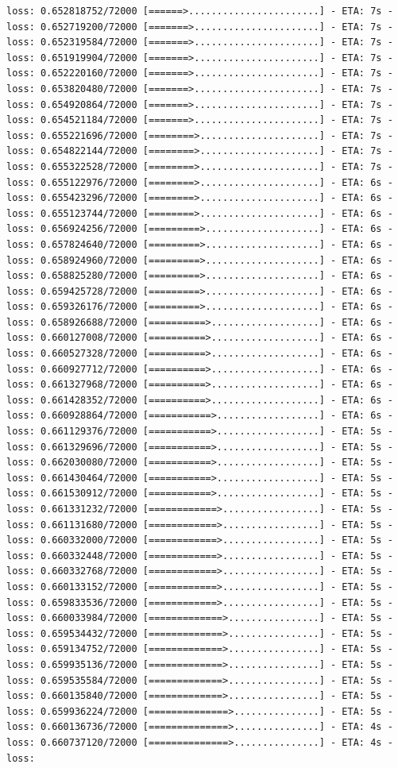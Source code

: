 \documentclass[12pt,fleqn]{article}\usepackage{../../common}
\begin{document}
\begin{verbatim}
loss: 0.652818752/72000 [======>.......................] - ETA: 7s - loss: 0.652719200/72000 [=======>......................] - ETA: 7s - loss: 0.652319584/72000 [=======>......................] - ETA: 7s - loss: 0.651919904/72000 [=======>......................] - ETA: 7s - loss: 0.652220160/72000 [=======>......................] - ETA: 7s - loss: 0.653820480/72000 [=======>......................] - ETA: 7s - loss: 0.654920864/72000 [=======>......................] - ETA: 7s - loss: 0.654521184/72000 [=======>......................] - ETA: 7s - loss: 0.655221696/72000 [========>.....................] - ETA: 7s - loss: 0.654822144/72000 [========>.....................] - ETA: 7s - loss: 0.655322528/72000 [========>.....................] - ETA: 7s - loss: 0.655122976/72000 [========>.....................] - ETA: 6s - loss: 0.655423296/72000 [========>.....................] - ETA: 6s - loss: 0.655123744/72000 [========>.....................] - ETA: 6s - loss: 0.656924256/72000 [=========>....................] - ETA: 6s - loss: 0.657824640/72000 [=========>....................] - ETA: 6s - loss: 0.658924960/72000 [=========>....................] - ETA: 6s - loss: 0.658825280/72000 [=========>....................] - ETA: 6s - loss: 0.659425728/72000 [=========>....................] - ETA: 6s - loss: 0.659326176/72000 [=========>....................] - ETA: 6s - loss: 0.658926688/72000 [==========>...................] - ETA: 6s - loss: 0.660127008/72000 [==========>...................] - ETA: 6s - loss: 0.660527328/72000 [==========>...................] - ETA: 6s - loss: 0.660927712/72000 [==========>...................] - ETA: 6s - loss: 0.661327968/72000 [==========>...................] - ETA: 6s - loss: 0.661428352/72000 [==========>...................] - ETA: 6s - loss: 0.660928864/72000 [===========>..................] - ETA: 6s - loss: 0.661129376/72000 [===========>..................] - ETA: 5s - loss: 0.661329696/72000 [===========>..................] - ETA: 5s - loss: 0.662030080/72000 [===========>..................] - ETA: 5s - loss: 0.661430464/72000 [===========>..................] - ETA: 5s - loss: 0.661530912/72000 [===========>..................] - ETA: 5s - loss: 0.661331232/72000 [============>.................] - ETA: 5s - loss: 0.661131680/72000 [============>.................] - ETA: 5s - loss: 0.660332000/72000 [============>.................] - ETA: 5s - loss: 0.660332448/72000 [============>.................] - ETA: 5s - loss: 0.660332768/72000 [============>.................] - ETA: 5s - loss: 0.660133152/72000 [============>.................] - ETA: 5s - loss: 0.659833536/72000 [============>.................] - ETA: 5s - loss: 0.660033984/72000 [=============>................] - ETA: 5s - loss: 0.659534432/72000 [=============>................] - ETA: 5s - loss: 0.659134752/72000 [=============>................] - ETA: 5s - loss: 0.659935136/72000 [=============>................] - ETA: 5s - loss: 0.659535584/72000 [=============>................] - ETA: 5s - loss: 0.660135840/72000 [=============>................] - ETA: 5s - loss: 0.659936224/72000 [==============>...............] - ETA: 5s - loss: 0.660136736/72000 [==============>...............] - ETA: 4s - loss: 0.660737120/72000 [==============>...............] - ETA: 4s - loss: 
\end{verbatim}
\end{document}
